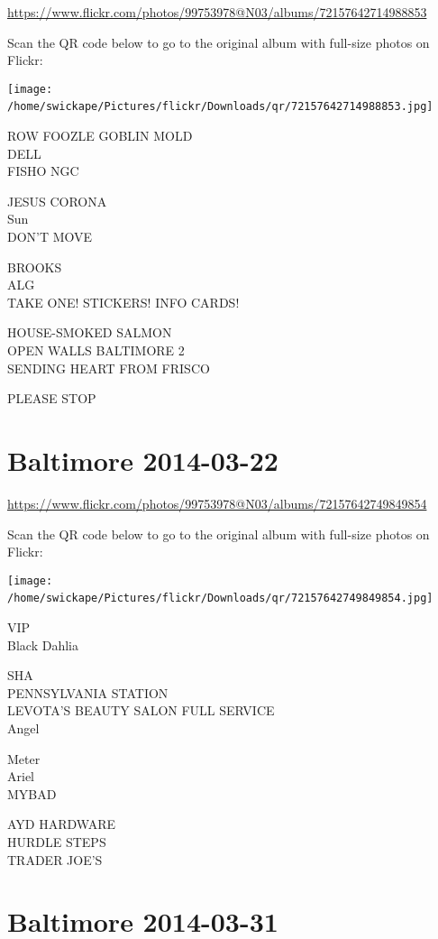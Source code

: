 \documentclass[10pt,letterpaper]{article}
\begin{document}
\url{https://www.flickr.com/photos/99753978@N03/albums/72157642714988853}

Scan the QR code below to go to the original album with full-size photos on Flickr:

\texttt{[image: /home/swickape/Pictures/flickr/Downloads/qr/72157642714988853.jpg]}
\

ROW FOOZLE GOBLIN MOLD\\
DELL\\
FISHO NGC

JESUS CORONA\\
Sun\\
DON'T MOVE

BROOKS\\
ALG\\
TAKE ONE!  STICKERS!  INFO CARDS!

HOUSE{-}SMOKED SALMON\\
OPEN WALLS BALTIMORE 2\\
SENDING HEART FROM FRISCO

PLEASE STOP
\

\section*{Baltimore 2014-03-22}

\url{https://www.flickr.com/photos/99753978@N03/albums/72157642749849854}

Scan the QR code below to go to the original album with full-size photos on Flickr:

\texttt{[image: /home/swickape/Pictures/flickr/Downloads/qr/72157642749849854.jpg]}
\

VIP\\
Black Dahlia

SHA\\
PENNSYLVANIA STATION\\
LEVOTA'S BEAUTY SALON FULL SERVICE\\
Angel

Meter\\
Ariel\\
MYBAD

AYD HARDWARE\\
HURDLE STEPS\\
TRADER JOE'S
\

\section*{Baltimore 2014-03-31}
\end{document}
